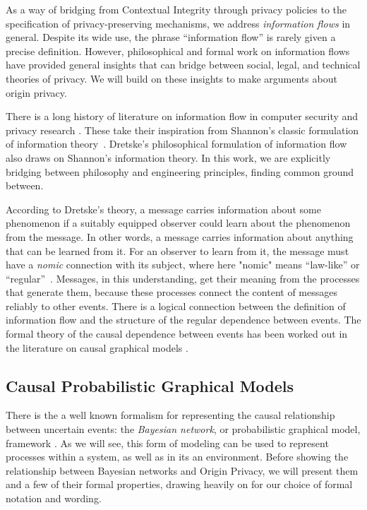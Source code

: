 \documentclass[../thesis.tex]{subfiles}
\begin{document}
As a way of bridging from Contextual Integrity through
privacy policies to the specification of privacy-preserving
mechanisms, we address \emph{information flows} in general.
Despite its wide use, the phrase ``information flow''
is rarely given a precise definition.
However, philosophical and formal work on information flows have
provided general insights that can bridge between social, legal,
and technical theories of privacy.
We will build on these insights to make
arguments about origin privacy.

There is a long history of literature on information flow
in computer security and privacy 
research \cite{mclean90sp,gray91sp,barthe04csf,tschantz15csf,smith15lics}.
These take their inspiration from Shannon's classic formulation 
of information theory~\cite{shannon1948mathematical}.
Dretske's philosophical
formulation of information flow~\cite{dretske1983epistemology}
also draws on Shannon's information theory.
In this work, we are explicitly bridging between philosophy and engineering
principles, finding common ground between.

According to Dretske's theory, a message
carries information about some phenomenon if a suitably equipped
observer could learn about the phenomenon from the message.
In other words, a message carries information about anything that
can be learned from it.
For an observer to learn from it, the message must have
a \emph{nomic} connection with its subject, where here "nomic" means
``law-like'' or ``regular''~\cite{dretske1981knowledge}.
Messages, in this understanding, get their meaning from the
processes that generate them, because these processes connect
the content of messages reliably to other events.
There is a logical connection between the definition of information
flow and the structure of the regular dependence between events.
The formal theory of the causal dependence between events has been
worked out in the literature on causal graphical 
models \cite{pearl1988probabilistic}.

\subsection{Causal Probabilistic Graphical Models}
\label{sec:orgheadline18}

There is the a well known formalism for representing
the causal relationship between uncertain events: the
\emph{Bayesian network}, or probabilistic 
graphical model, framework \cite{pearl1988probabilistic}. 
As we will see, this form of modeling can be used to represent
processes within a system, as well as in its an environment.
Before showing the relationship between Bayesian networks
and Origin Privacy, we will present them and a few of their
formal properties, drawing heavily on \cite{koller2003multi}
for our choice of formal notation and wording.
\end{document}
